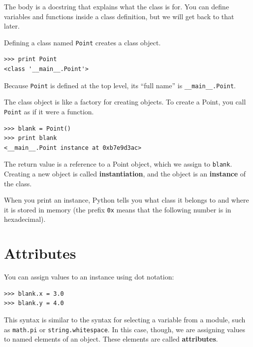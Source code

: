 \documentclass[10pt]{book}
\begin{document}

The body is a docstring that explains what the class is for.
You can define variables and functions inside a class definition,
but we will get back to that later.


Defining a class named {\tt Point} creates a class object.

\beforeverb
\begin{verbatim}
>>> print Point
<class '__main__.Point'>
\end{verbatim}
\afterverb
%
Because {\tt Point} is defined at the top level, its ``full
name'' is \verb"__main__.Point".


The class object is like a factory for creating objects.  To create a
Point, you call {\tt Point} as if it were a function.

\beforeverb
\begin{verbatim}
>>> blank = Point()
>>> print blank
<__main__.Point instance at 0xb7e9d3ac>
\end{verbatim}
\afterverb
%
The return value is a reference to a Point object, which we
assign to {\tt blank}.  
Creating a new object is called
{\bf instantiation}, and the object is an {\bf instance} of
the class.


When you print an instance, Python tells you what class it
belongs to and where it is stored in memory (the prefix
{\tt 0x} means that the following number is in hexadecimal).



\section{Attributes}


You can assign values to an instance using dot notation:

\beforeverb
\begin{verbatim}
>>> blank.x = 3.0
>>> blank.y = 4.0
\end{verbatim}
\afterverb
%
This syntax is similar to the syntax for selecting a variable from a
module, such as {\tt math.pi} or {\tt string.whitespace}.  In this case,
though, we are assigning values to named elements of an object.
These elements are called {\bf attributes}.
\end{document}
